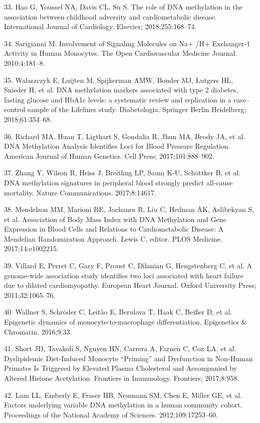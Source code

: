 \documentclass[]{bmcart}
\begin{document}
33. Hao G, Youssef NA, Davis CL, Su S. The role of DNA methylation in
the association between childhood adversity and cardiometabolic disease.
International Journal of Cardiology. Elsevier; 2018;255:168--74.

34. Sarigianni M. Involvement of Signaling Molecules on Na+ /H+
Exchanger-1 Activity in Human Monocytes. The Open Cardiovascular
Medicine Journal. 2010;4:181--8.

35. Walaszczyk E, Luijten M, Spijkerman AMW, Bonder MJ, Lutgers HL,
Snieder H, et al. DNA methylation markers associated with type 2
diabetes, fasting glucose and HbA1c levels: a systematic review and
replication in a case--control sample of the Lifelines study.
Diabetologia. Springer Berlin Heidelberg; 2018;61:354--68.

36. Richard MA, Huan T, Ligthart S, Gondalia R, Jhun MA, Brody JA, et
al. DNA Methylation Analysis Identifies Loci for Blood Pressure
Regulation. American Journal of Human Genetics. Cell Press;
2017;101:888--902.

37. Zhang Y, Wilson R, Heiss J, Breitling LP, Saum K-U, Sch{ö}ttker B,
et al. DNA methylation signatures in peripheral blood strongly predict
all-cause mortality. Nature Communications. 2017;8:14617.

38. Mendelson MM, Marioni RE, Joehanes R, Liu C, Hedman ÅK, Aslibekyan
S, et al. Association of Body Mass Index with DNA Methylation and Gene
Expression in Blood Cells and Relations to Cardiometabolic Disease: A
Mendelian Randomization Approach. Lewis C, editor. PLOS Medicine.
2017;14:e1002215.

39. Villard E, Perret C, Gary F, Proust C, Dilanian G, Hengstenberg C,
et al. A genome-wide association study identifies two loci associated
with heart failure due to dilated cardiomyopathy. European Heart
Journal. Oxford University Press; 2011;32:1065--76.

40. Wallner S, Schr{ö}der C, Leit{ã}o E, Berulava T, Haak C, Bei{ß}er D,
et al. Epigenetic dynamics of monocyte-to-macrophage differentiation.
Epigenetics \& Chromatin. 2016;9:33.

41. Short JD, Tavakoli S, Nguyen HN, Carrera A, Farnen C, Cox LA, et al.
Dyslipidemic Diet-Induced Monocyte ``Priming'' and Dysfunction in
Non-Human Primates Is Triggered by Elevated Plasma Cholesterol and
Accompanied by Altered Histone Acetylation. Frontiers in Immunology.
Frontiers; 2017;8:958.

42. Lam LL, Emberly E, Fraser HB, Neumann SM, Chen E, Miller GE, et al.
Factors underlying variable DNA methylation in a human community cohort.
Proceedings of the National Academy of Sciences. 2012;109:17253--60.
\end{document}
